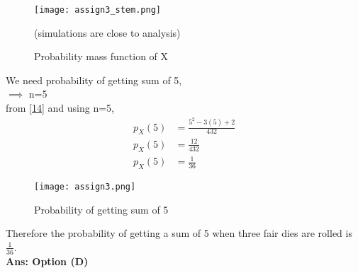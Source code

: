 \documentclass[journal,12pt,twocolumn]{IEEEtran}
\begin{document}
\begin{figure}[htp]
    \centering
    \texttt{[image: assign3\_stem.png]}
    \caption{Probability mass function of X}{ (simulations are close to analysis)}
\end{figure}
We need probability of getting sum of 5,\\$\implies$ n=5 \\from \eqref{14} and using n=5,
\begin{align}
    p_X(5)&=\frac{5^2-3(5)+2}{432}\\
    p_X(5)&=\frac{12}{432}\\
    p_X(5)&=\frac{1}{36}
\end{align}
\begin{figure}[htp]
    \centering
    \texttt{[image: assign3.png]}
    \caption{Probability of getting sum of 5}
\end{figure}

Therefore the probability of getting a sum of 5 when three fair dies are rolled is $\frac{1}{36}$.\\
\textbf{Ans: Option (D)}
\end{document}

